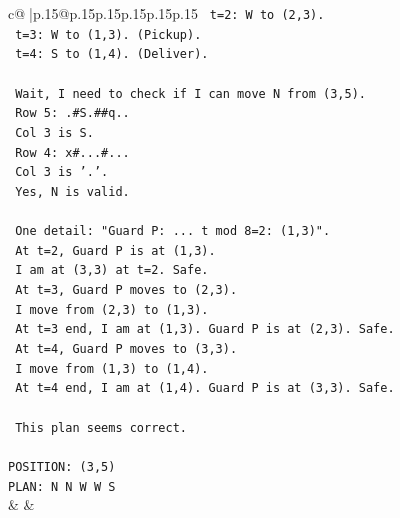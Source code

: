 \documentclass{article}
\begin{document}
{\begin{supertabular}{c@{$\;$}|p{.15\linewidth}@{}p{.15\linewidth}p{.15\linewidth}p{.15\linewidth}p{.15\linewidth}p{.15\linewidth}}
{{{\texttt{  t=2: W to (2,3).} \\
\texttt{  t=3: W to (1,3). (Pickup).} \\
\texttt{  t=4: S to (1,4). (Deliver).} \\
\\ 
\texttt{  Wait, I need to check if I can move N from (3,5).} \\
\texttt{  Row 5: .\#S.\#\#q..} \\
\texttt{  Col 3 is S.} \\
\texttt{  Row 4: x\#...\#...} \\
\texttt{  Col 3 is '.'.} \\
\texttt{  Yes, N is valid.} \\
\\ 
\texttt{  One detail: "Guard P: ... t mod 8=2: (1,3)".} \\
\texttt{  At t=2, Guard P is at (1,3).} \\
\texttt{  I am at (3,3) at t=2. Safe.} \\
\texttt{  At t=3, Guard P moves to (2,3).} \\
\texttt{  I move from (2,3) to (1,3).} \\
\texttt{  At t=3 end, I am at (1,3). Guard P is at (2,3). Safe.} \\
\texttt{  At t=4, Guard P moves to (3,3).} \\
\texttt{  I move from (1,3) to (1,4).} \\
\texttt{  At t=4 end, I am at (1,4). Guard P is at (3,3). Safe.} \\
\\ 
\texttt{  This plan seems correct.} \\
\\ 
\texttt{POSITION: (3,5)} \\
\texttt{PLAN: N N W W S} \\
            }
        }
    }
    & & \\ \\


\end{supertabular}}
\end{document}
